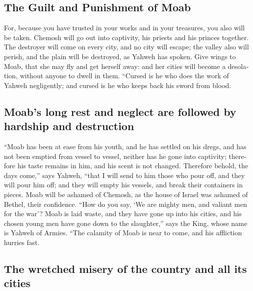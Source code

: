 \begin{paracol}{2}
\begin{otherlanguage}{english}
\hypertarget{the-guilt-and-punishment-of-moab}{%
\subsection{The Guilt and Punishment of
Moab}\label{the-guilt-and-punishment-of-moab}}

 For, because you have trusted in your works and in your
treasures, you also will be taken. Chemosh will go out into captivity,
his priests and his princes together.  The destroyer will
come on every city, and no city will escape; the valley also will
perish, and the plain will be destroyed, as Yahweh has spoken.
 Give wings to Moab, that she may fly and get herself
away: and her cities will become a desolation, without anyone to dwell
in them.  ``Cursed is he who does the work of Yahweh
negligently; and cursed is he who keeps back his sword from blood.

\hypertarget{moabs-long-rest-and-neglect-are-followed-by-hardship-and-destruction}{%
\subsection{Moab's long rest and neglect are followed by hardship and
destruction}\label{moabs-long-rest-and-neglect-are-followed-by-hardship-and-destruction}}

 ``Moab has been at ease from his youth, and he has
settled on his dregs, and has not been emptied from vessel to vessel,
neither has he gone into captivity; therefore his taste remains in him,
and his scent is not changed.  Therefore behold, the days
come,'' says Yahweh, ``that I will send to him those who pour off, and
they will pour him off; and they will empty his vessels, and break their
containers in pieces.  Moab will be ashamed of Chemosh,
as the house of Israel was ashamed of Bethel, their confidence.
 ``How do you say, `We are mighty men, and valiant men
for the war'?  Moab is laid waste, and they have gone up
into his cities, and his chosen young men have gone down to the
slaughter,'' says the King, whose name is Yahweh of Armies.
 ``The calamity of Moab is near to come, and his
affliction hurries fast.

\hypertarget{the-wretched-misery-of-the-country-and-all-its-cities}{%
\subsection{The wretched misery of the country and all its
cities}\label{the-wretched-misery-of-the-country-and-all-its-cities}}


\end{otherlanguage}
\end{paracol}
